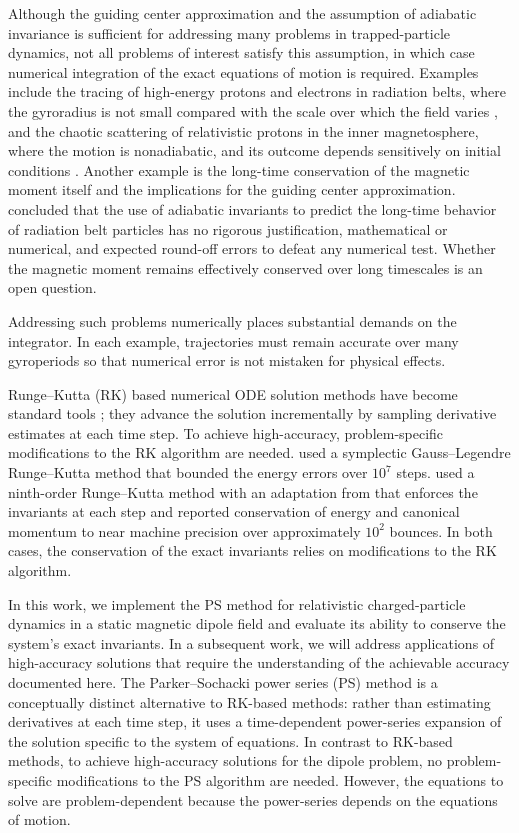 \documentclass[draft]{agujournal2019}
\begin{document}
Although the guiding center approximation and the assumption of adiabatic invariance is sufficient for addressing many problems in trapped-particle dynamics, not all problems of interest satisfy this assumption, in which case numerical integration of the exact equations of motion is required. Examples include the tracing of high-energy protons and electrons in radiation belts, where the gyroradius is not small compared with the scale over which the field varies \cite{Yugo2001, Yugo2007}, and the chaotic scattering of relativistic protons in the inner magnetosphere, where the motion is nonadiabatic, and its outcome depends sensitively on initial conditions \cite{Meseguer2025}. Another example is the long-time conservation of the magnetic moment itself and the implications for the guiding center approximation.  concluded that the use of adiabatic invariants to predict the long-time behavior of radiation belt particles has no rigorous justification, mathematical or numerical, and expected round-off errors to defeat any numerical test. Whether the magnetic moment remains effectively conserved over long timescales is an open question.

Addressing such problems numerically places substantial demands on the integrator. In each example, trajectories must remain accurate over many gyroperiods so that numerical error is not mistaken for physical effects.

Runge--Kutta (RK) based numerical ODE solution methods have become standard tools \cite{Chapra2021, Butcher2016}; they advance the solution incrementally by sampling derivative estimates at each time step. To achieve high-accuracy, problem-specific modifications to the RK algorithm are needed.  used a symplectic Gauss--Legendre Runge--Kutta method that bounded the energy errors over $10^7$ steps.  used a ninth-order Runge--Kutta method with an adaptation from \cite{Calvo2006} that enforces the invariants at each step and reported conservation of energy and canonical momentum to near machine precision over approximately $10^2$ bounces. In both cases, the conservation of the exact invariants relies on modifications to the RK algorithm. 

In this work, we implement the PS method for relativistic charged-particle dynamics in a static magnetic dipole field and evaluate its ability to conserve the system's exact invariants. In a subsequent work, we will address applications of high-accuracy solutions that require the understanding of the achievable accuracy documented here. The Parker--Sochacki power series (PS) method is a conceptually distinct alternative to RK-based methods: rather than estimating derivatives at each time step, it uses a time-dependent power-series expansion of the solution specific to the system of equations. In contrast to RK-based methods, to achieve high-accuracy solutions for the dipole problem, no problem-specific modifications to the PS algorithm are needed. However, the equations to solve are problem-dependent because the power-series depends on the equations of motion.
\end{document}
